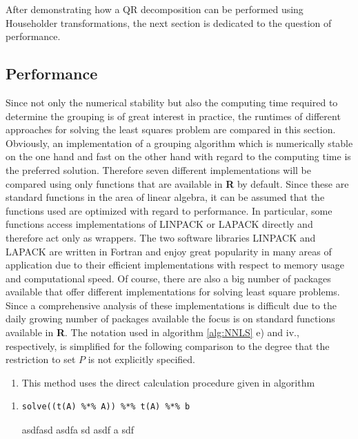 After demonstrating how a QR decomposition can be performed using Householder transformations, the next section is dedicated to the question of performance. 

\subsection{Performance}

Since not only the numerical stability but also the computing time required to determine the grouping is of great interest in practice, the runtimes of different approaches for solving the least squares problem are compared in this section. Obviously, an implementation of a grouping algorithm which is numerically stable on the one hand and fast on the other hand with regard to the computing time is the preferred solution. Therefore seven different implementations will be compared using only functions that are available in \textbf{\textsf{R}} by default. Since these are standard functions in the area of linear algebra, it can be assumed that the functions used are optimized with regard to performance. In particular, some functions access implementations of LINPACK or LAPACK directly and therefore act only as wrappers. The two software libraries LINPACK and LAPACK are written in Fortran and enjoy great popularity in many areas of application due to their efficient implementations with respect to memory usage and computational speed. Of course, there are also a big number of packages available that offer different implementations for solving least square problems. Since a comprehensive analysis of these implementations is difficult due to the daily growing number of packages available the focus is on standard functions available in \textbf{\textsf{R}}. The notation used in algorithm \ref{alg:NNLS} e) and iv., respectively, is simplified for the following comparison to the degree that the restriction to set $P$ is not explicitly specified.

\begin{enumerate}[label={\bfseries Method \arabic*:}, leftmargin=*, labelindent=1em, series = quest]
	\item This method uses the direct calculation procedure given in algorithm \
\end{enumerate}

\begin{enumerate}[series = inform]
	\item[] \begin{lstlisting}[otherkeywords={\%*\%}]
				solve((t(A) %*% A)) %*% t(A) %*% b
			\end{lstlisting}
	
	asdfasd asdfa sd asdf a sdf
\end{enumerate}


